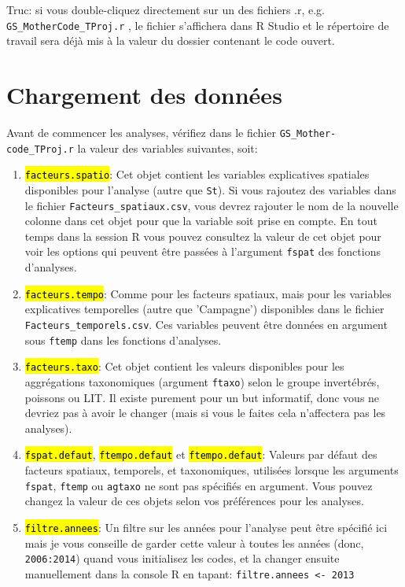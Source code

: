 \documentclass{article}
\newcommand{\mcode} {\texttt{GS\_MotherCode\_TProj.r}{ }}
\begin{document}
Truc: si vous double-cliquez directement sur un des fichiers .r,
e.g. \mcode, le fichier s'affichera dans R
Studio et le répertoire de travail sera déjà mis à la valeur du
dossier contenant le code ouvert.

\section{Chargement des données}

Avant de commencer les analyses, vérifiez dans le fichier
\texttt{GS\_Mother-code\_TProj.r} la valeur des variables suivantes,
soit:
\begin{enumerate}
\item \hl{\texttt{facteurs.spatio}}: Cet objet contient les variables
  explicatives spatiales disponibles pour l'analyse (autre que
  \texttt{St}). Si vous rajoutez des variables dans le fichier
  \texttt{Facteurs\_spatiaux.csv}, vous devrez rajouter le nom de la
  nouvelle colonne dans cet objet pour que la variable soit prise en
  compte. En tout temps dans la session R vous pouvez consultez la
  valeur de cet objet pour voir les options qui peuvent être passées à
  l'argument \texttt{fspat} des fonctions d'analyses.
\item \hl{\texttt{facteurs.tempo}}: Comme pour les facteurs spatiaux,
  mais pour les variables explicatives temporelles (autre que
  'Campagne') disponibles dans le fichier
  \texttt{Facteurs\_temporels.csv}. Ces variables peuvent être données
  en argument sous \texttt{ftemp} dans les fonctions d'analyses.
\item \hl{\texttt{facteurs.taxo}}: Cet objet contient les valeurs
  disponibles pour les aggrégations taxonomiques (argument
  \texttt{ftaxo}) selon le groupe invertébrés, poissons ou LIT. Il
  existe purement pour un but
  informatif, donc vous ne devriez pas à avoir le changer (mais si
  vous le faites cela n'affectera pas les analyses).
\item \hl{\texttt{fspat.defaut}}, \hl{\texttt{ftempo.defaut}} et
  \hl{\texttt{ftempo.defaut}}: Valeurs par défaut des facteurs
  spatiaux, temporels, et taxonomiques, utilisées lorsque les
  arguments \texttt{fspat}, \texttt{ftemp} ou \texttt{agtaxo} ne sont
  pas spécifiés en argument. Vous pouvez changez la valeur de ces
  objets selon vos préférences pour les analyses.
\item \hl{\texttt{filtre.annees}}: Un filtre sur les années pour
  l'analyse peut être spécifié ici mais je vous conseille de garder
  cette valeur à toutes les années (donc, \texttt{2006:2014}) quand vous
  initialisez les codes, et la changer ensuite manuellement dans la
  console R en tapant: \texttt{filtre.annees <- 2013}


\end{enumerate}
\end{document}
